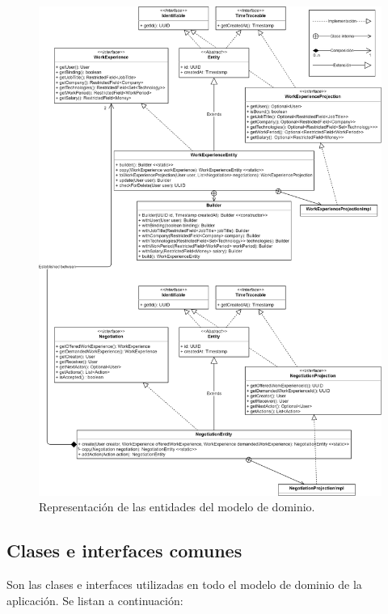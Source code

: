\documentclass[a4paper, 12pt]{book}
\begin{document}
\begin{figure}
  \centering
  \includegraphics[width=15cm, keepaspectratio]{img/Modelo_dominio_entities.png}
  \caption{Representación de las entidades del modelo de dominio.}\label{fig:domain_model_entities}
\end{figure}

\subsection{Clases e interfaces comunes}
\label{subsec:common_classes}
Son las clases e interfaces utilizadas en todo el modelo de dominio de la aplicación. Se listan a continuación:
\end{document}
